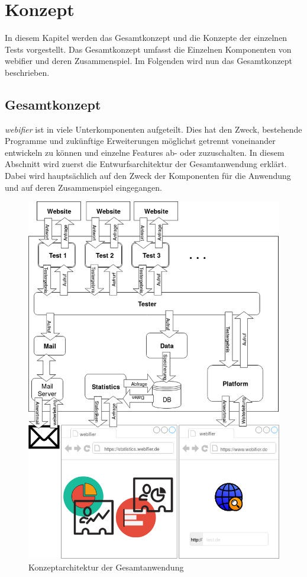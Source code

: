 \chapter{Konzept}

In diesem Kapitel werden das Gesamtkonzept und die Konzepte der einzelnen Tests vorgestellt. Das Gesamtkonzept umfasst die Einzelnen Komponenten von webifier und deren Zusammenspiel. Im Folgenden wird nun das Gesamtkonzept beschrieben.

\section{Gesamtkonzept}

\textit{webifier} ist in viele Unterkomponenten aufgeteilt.
Dies hat den Zweck, bestehende Programme und zukünftige Erweiterungen möglichst getrennt voneinander entwickeln zu können und einzelne Features ab- oder zuzuschalten.
In diesem Abschnitt wird zuerst die Entwurfsarchitektur der Gesamtanwendung erklärt.
Dabei wird hauptsächlich auf den Zweck der Komponenten für die Anwendung und auf deren Zusammenspiel eingegangen.

\begin{figure}[H]
	\centering
	\includegraphics[width=\textwidth]{images/anwendung-konzept}
	\caption{Konzeptarchitektur der Gesamtanwendung}
	\label{fig:anwendung-konzept}
\end{figure}

